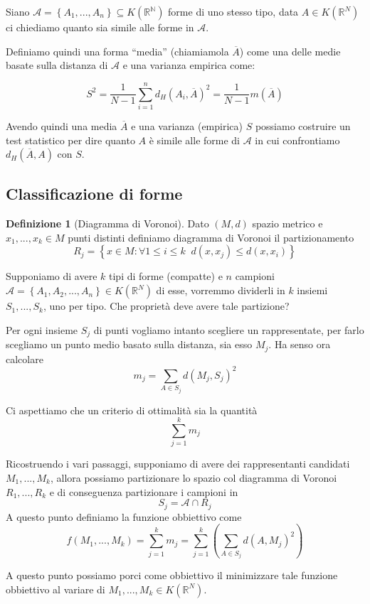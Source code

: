 \documentclass[a4paper,10pt]{article}
\newcounter{counter1}
\theoremstyle{plain}
\theoremstyle{definition}
\newtheorem{mydef}[counter1]{Definizione}
\theoremstyle{remark}
\newcommand{\obar}[1]{\overline{#1}}
\newcommand{\set}[1]{\left\{#1\right\}}
\newcommand{\pa}[1]{\left(#1\right)}
\begin{document}
Siano $\mathcal{A} = \set{ A_1,...,A_n} \subseteq K(\mathbb{R^N})$
forme di uno stesso tipo, data $A \in K(\mathbb{R}^N)$ ci chiediamo
quanto sia simile alle forme in $\mathcal{A}$.

Definiamo quindi una forma ``media'' (chiamiamola $\obar A$) come una
delle medie basate sulla distanza di $\mathcal{A}$ e una varianza
empirica come:

\[ S^2 = \frac{1}{N-1} \sum _{i=1} ^n d_H(A_i , \obar A)^2 =
\frac{1}{N-1} m(\obar A) \]

Avendo quindi una media $\obar A$ e una varianza (empirica) $S$
possiamo costruire un test statistico per dire quanto $A$ è simile
alle forme di $\mathcal{A}$ in cui confrontiamo $d_H(\obar A, A)$ con
$S$.

\subsection{Classificazione di forme}

\begin{mydef}[Diagramma di Voronoi]
  Dato $(M,d)$ spazio metrico e $x_1,...,x_k \in M$ punti distinti
  definiamo diagramma di Voronoi il partizionamento
  \[ R_j = \set{ x\in M : \forall 1 \le i \le k \;\; d(x,x_j) \le
    d(x,x_i) } \]
\end{mydef}

Supponiamo di avere $k$ tipi di forme (compatte) e $n$ campioni
$\mathcal{A} = \set{ A_1, A_2,..., A_n} \in K(\mathbb{R}^N)$ di esse,
vorremmo dividerli in $k$ insiemi $S_1,...,S_k$, uno per tipo. Che
proprietà deve avere tale partizione?

Per ogni insieme $S_j$ di punti vogliamo intanto scegliere un
rappresentate, per farlo scegliamo un punto medio basato sulla
distanza, sia esso $M_j$. Ha senso ora calcolare
\[ m_j = \sum _{A\in S_j} d(M_j,S_j)^2 \]

Ci aspettiamo che un criterio di ottimalità sia la quantità
\[ \sum _{j=1} ^k m_j \]

Ricostruendo i vari passaggi, supponiamo di avere dei rappresentanti
candidati $M_1,...,M_k$, allora possiamo partizionare lo spazio col
diagramma di Voronoi $R_1,...,R_k$ e di conseguenza partizionare i
campioni in
\[ S_j = \mathcal{A} \cap R_j \]
A questo punto definiamo la funzione obbiettivo come
\[ f(M_1,...,M_k) = \sum _{j = 1} ^k m_j = \sum _{j = 1} ^k \pa{ \sum
  _{A \in S_j} d(A,M_j)^2 } \]

A questo punto possiamo porci come obbiettivo il minimizzare tale
funzione obbiettivo al variare di $M_1,...,M_k \in K(\mathbb{R}^N)$.
\end{document}
